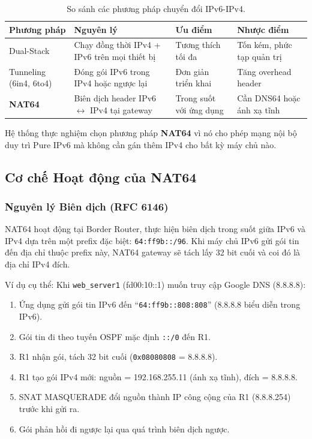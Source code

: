 \begin{table}[H]
    \centering
    \caption{So sánh các phương pháp chuyển đổi IPv6-IPv4.}
    \label{tab:transition_methods}
    \begin{tabular}{|p{2.5cm}|p{4cm}|p{3.5cm}|p{3.5cm}|}
        \hline
        \textbf{Phương pháp} & \textbf{Nguyên lý} & \textbf{Ưu điểm} & \textbf{Nhược điểm} \\
        \hline
        Dual-Stack & Chạy đồng thời IPv4 + IPv6 trên mọi thiết bị & Tương thích tối đa & Tốn kém, phức tạp quản trị \\
        \hline
        Tunneling (6in4, 6to4) & Đóng gói IPv6 trong IPv4 hoặc ngược lại & Đơn giản triển khai & Tăng overhead header \\
        \hline
        \textbf{NAT64} & Biên dịch header IPv6 $\leftrightarrow$ IPv4 tại gateway & Trong suốt với ứng dụng & Cần DNS64 hoặc ánh xạ tĩnh \\
        \hline
    \end{tabular}
\end{table}

Hệ thống thực nghiệm chọn phương pháp \textbf{NAT64} vì nó cho phép mạng nội bộ duy trì Pure IPv6 mà không cần gán thêm IPv4 cho bất kỳ máy chủ nào.

\subsection{Cơ chế Hoạt động của NAT64}

\subsubsection{Nguyên lý Biên dịch (RFC 6146)}

NAT64 hoạt động tại Border Router, thực hiện biên dịch trong suốt giữa IPv6 và IPv4 dựa trên một prefix đặc biệt: \texttt{64:ff9b::/96}. Khi máy chủ IPv6 gửi gói tin đến địa chỉ thuộc prefix này, NAT64 gateway sẽ tách lấy 32 bit cuối và coi đó là địa chỉ IPv4 đích.

Ví dụ cụ thể: Khi \texttt{web\_server1} (fd00:10::1) muốn truy cập Google DNS (8.8.8.8):
\begin{enumerate}
    \item Ứng dụng gửi gói tin IPv6 đến ``\texttt{64:ff9b::808:808}'' (8.8.8.8 biểu diễn trong IPv6).
    \item Gói tin đi theo tuyến OSPF mặc định \texttt{::/0} đến R1.
    \item R1 nhận gói, tách 32 bit cuối (\texttt{0x08080808} = 8.8.8.8).
    \item R1 tạo gói IPv4 mới: nguồn = 192.168.255.11 (ánh xạ tĩnh), đích = 8.8.8.8.
    \item SNAT MASQUERADE đổi nguồn thành IP công cộng của R1 (8.8.8.254) trước khi gửi ra.
    \item Gói phản hồi đi ngược lại qua quá trình biên dịch ngược.
\end{enumerate}

